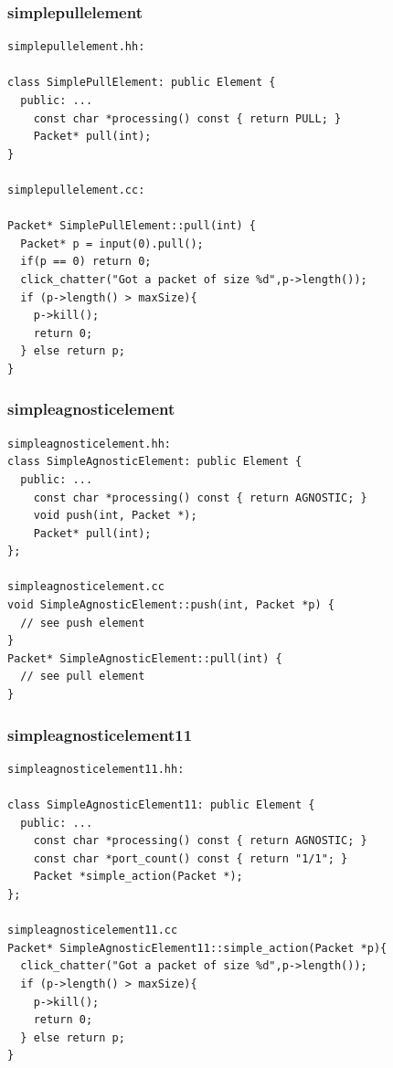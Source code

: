 \documentclass{beamer}
\begin{document}
\begin{frame}[fragile]
\frametitle{simplepullelement}
\begin{lstlisting}[basicstyle=\scriptsize]
simplepullelement.hh:

class SimplePullElement: public Element { 
  public: ...
    const char *processing() const { return PULL; }
    Packet* pull(int);
}

simplepullelement.cc:

Packet* SimplePullElement::pull(int) {
  Packet* p = input(0).pull();
  if(p == 0) return 0;
  click_chatter("Got a packet of size %d",p->length());
  if (p->length() > maxSize){
    p->kill();
    return 0;
  } else return p;
}
\end{lstlisting}
\end{frame}

\begin{frame}[fragile]
\frametitle{simpleagnosticelement}
\begin{lstlisting}[basicstyle=\footnotesize,emph={AGNOSTIC},emphstyle=\underbar]
simpleagnosticelement.hh:
class SimpleAgnosticElement: public Element { 
  public: ...
    const char *processing() const { return AGNOSTIC; }
    void push(int, Packet *);
    Packet* pull(int);
};

simpleagnosticelement.cc
void SimpleAgnosticElement::push(int, Packet *p) {
  // see push element
}
Packet* SimpleAgnosticElement::pull(int) {
  // see pull element
}
\end{lstlisting}
\end{frame}

\begin{frame}[fragile]
\frametitle{simpleagnosticelement11}
\begin{lstlisting}[basicstyle=\scriptsize, emph={AGNOSTIC,simple_action},emphstyle=\underbar]
simpleagnosticelement11.hh:

class SimpleAgnosticElement11: public Element { 
  public: ...
    const char *processing() const { return AGNOSTIC; }
    const char *port_count() const { return "1/1"; }
    Packet *simple_action(Packet *);
};

simpleagnosticelement11.cc
Packet* SimpleAgnosticElement11::simple_action(Packet *p){
  click_chatter("Got a packet of size %d",p->length());
  if (p->length() > maxSize){
    p->kill();
    return 0;
  } else return p;
}
\end{lstlisting}
\end{frame}
\end{document}
